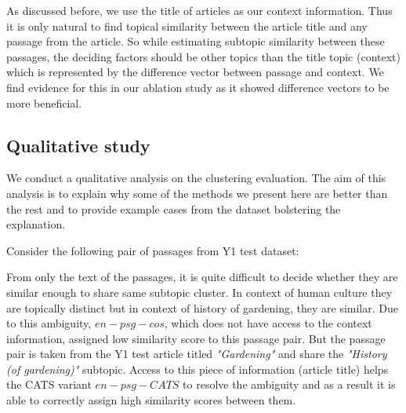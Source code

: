 \documentclass[sigconf,authordraft]{acmart}
\begin{document}
As discussed before, we use the title of articles as our context information. Thus it is only natural to find topical similarity between the article title and any passage from the article. So while estimating subtopic similarity between these passages, the deciding factors should be other topics than the title topic (context) which is represented by the difference vector between passage and context. We find evidence for this in our ablation study as it showed difference vectors to be more beneficial. 

\subsection{Qualitative study} We conduct a qualitative analysis on the clustering evaluation. The aim of this analysis is to explain why some of the methods we present here are better than the rest and to provide example cases from the dataset bolstering the explanation.

Consider the following pair of passages from Y1 test dataset:

\noindent{}

From only the text of the passages, it is quite difficult to decide whether they are similar enough to share same subtopic cluster. In context of human culture they are topically distinct but in context of history of gardening, they are similar. Due to this ambiguity, $en-psg-cos$, which does not have access to the context information, assigned low similarity score to this passage pair. But the passage pair is taken from the Y1 test article titled \textit{"Gardening"} and share the \textit{"History (of gardening)"} subtopic. Access to this piece of information (article title) helps the CATS variant $en-psg-CATS$ to resolve the ambiguity and as a result it is able to correctly assign high similarity scores between them.
\end{document}

